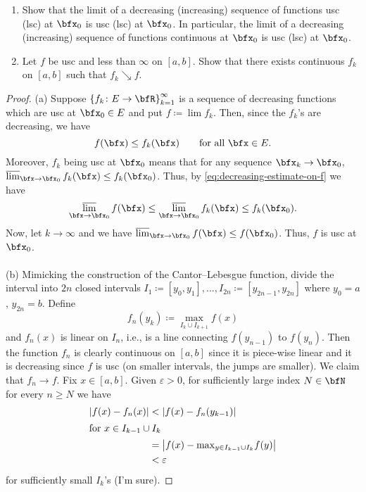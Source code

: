 \begin{problem}
\begin{enumerate}[label=(\alph*)]
\item Show that the limit of a decreasing (increasing) sequence of
  functions usc (lsc) at $\bfx_0$ is usc (lsc) at $\bfx_0$. In particular,
  the limit of a decreasing (increasing) sequence of functions continuous
  at $\bfx_0$ is usc (lsc) at $\bfx_0$.
\item Let $f$ be usc and less than $\infty$ on $[a,b]$. Show that there
  exists continuous $f_k$ on $[a,b]$ such that $f_k\searrow f$.
\end{enumerate}
\end{problem}
\begin{proof}
(a) Suppose $\left\{f_k\colon E\to\bfR\right\}_{k=1}^\infty$ is a sequence
of decreasing functions which are usc at $\bfx_0\in E$ and put $f\coloneqq\lim
f_k$. Then, since the $f_k$'s are decreasing, we have
\begin{equation}
  \label{eq:decreasing-estimate-on-f}
f(\bfx)\leq f_k(\bfx)\qquad\text{for all $\bfx\in E$.}
\end{equation}
Moreover, $f_k$ being usc at $\bfx_0$ means that for any sequence
$\bfx_k\to\bfx_0$, $\varlimsup_{\bfx\to\bfx_0} f_k(\bfx)\leq
f_k(\bfx_0)$. Thus, by \eqref{eq:decreasing-estimate-on-f} we have
\begin{equation}
  \label{eq:limit-estimate-on-f}
\varlimsup_{\bfx\to\bfx_0}f(\bfx)\leq\varlimsup_{\bfx\to\bfx_0}
f_k(\bfx)\leq f_k(\bfx_0).
\end{equation}
Now, let $k\to\infty$ and we have $\varlimsup_{\bfx\to\bfx_0} f(\bfx)\leq
f(\bfx_0)$. Thus, $f$ is usc at $\bfx_0$.
\\\\
(b) Mimicking the construction of the Cantor--Lebesgue function, divide the
interval into $2n$ closed intervals
$I_1\coloneqq[y_0,y_1],...,I_{2n}\coloneqq[y_{2n-1},y_{2n}]$ where $y_0=a$,
$y_{2n}=b$. Define
\begin{equation}
  \label{eq:define-fn}
f_n(y_k)\coloneqq\max_{I_{k}\cup I_{k+1}} f(x)
\end{equation}
and $f_n(x)$ is linear on $I_n$, i.e., is a line connecting $f(y_{n-1})$ to
$f(y_n)$. Then the function $f_n$ is clearly continuous on $[a,b]$ since it
is piece-wise linear and it is decreasing since $f$ is usc (on smaller
intervals, the jumps are smaller). We claim that $f_n\to f$.  Fix
$x\in[a,b]$. Given $\varepsilon>0$, for sufficiently large index $N\in\bfN$
for every $n\geq N$ we have
\begin{align*}
|f(x)-f_n(x)|&<\left|f(x)-f_n(y_{k-1})\right|\\
\shortintertext{for $x\in I_{k-1}\cup I_k$}
             &=\bigl|f(x)-{\textstyle\max_{y\in I_{k-1}\cup I_{k}}}f(y)\bigr|\\
             &<\varepsilon
\end{align*}
for sufficiently small $I_k$'s (I'm sure).
\end{proof}
\newpage

